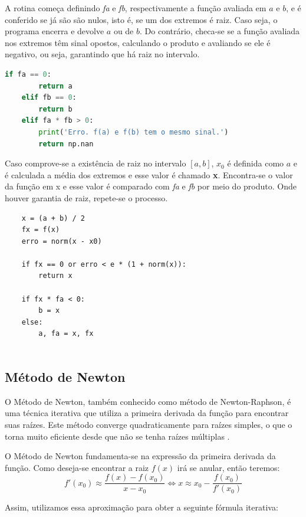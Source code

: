 \documentclass{article}
\begin{document}
A rotina começa  definindo \textit{fa} e \textit{fb}, respectivamente a função avaliada em $a$ e $b$, e é conferido se já são são nulos, isto é, se um dos extremos é raiz. Caso seja, o programa encerra e devolve $a$ ou de $b$. Do contrário, checa-se se a função avaliada nos extremos têm sinal opostos, calculando o produto e avaliando se ele é negativo, ou seja, garantindo que há raiz no intervalo.

\begin{lstlisting}[language=Python]
    if fa == 0:
        return a
    elif fb == 0:
        return b
    elif fa * fb > 0:
        print('Erro. f(a) e f(b) tem o mesmo sinal.')
        return np.nan
\end{lstlisting}

Caso comprove-se a existência de raiz no intervalo $[a,b]$, $x_0$ é definida como $a$ e é calculada a média dos extremos e esse valor é chamado \textbf{x}. Encontra-se o valor da função em x e esse valor é comparado com \textit{fa} e \textit{fb} por meio do produto. Onde houver garantia de raiz, repete-se o processo.   

\begin{lstlisting}
    x = (a + b) / 2
    fx = f(x)
    erro = norm(x - x0)
        
    if fx == 0 or erro < e * (1 + norm(x)):
        return x
        
    if fx * fa < 0:
        b = x
    else:
        a, fa = x, fx
        
\end{lstlisting}


\subsection{M\'{e}todo de Newton}
O M\'{e}todo de Newton, tamb\'{e}m conhecido como m\'{e}todo de Newton-Raphson, \'{e} uma t\'{e}cnica iterativa que utiliza a primeira derivada da fun\c{c}\~{a}o para encontrar suas ra\'{i}zes. Este m\'{e}todo converge quadraticamente para ra\'{i}zes simples, o que o torna muito eficiente desde que não se tenha raízes múltiplas \cite{atk}. 

O Método de Newton fundamenta-se na expressão da primeira derivada da função. Como deseja-se encontrar a raiz $f(x)$ irá se anular, então teremos: 
$$f'(x_0)\approx\frac{f(x)-f(x_0)}{x-x_0} \Longleftrightarrow  x \approx x_0 - \frac{f(x_0)}{f'(x_0)}$$

Assim, utilizamos essa aproximação para obter a seguinte fórmula iterativa:
\end{document}

